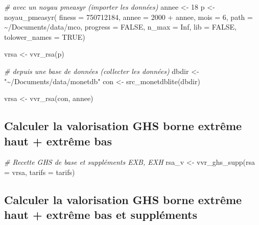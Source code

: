\documentclass[
]{book}
\newenvironment{Shaded}{\begin{snugshade}}{\end{snugshade}}
\newcommand{\AttributeTok}[1]{\textcolor[rgb]{0.77,0.63,0.00}{#1}}
\newcommand{\CommentTok}[1]{\textcolor[rgb]{0.56,0.35,0.01}{\textit{#1}}}
\newcommand{\ConstantTok}[1]{\textcolor[rgb]{0.00,0.00,0.00}{#1}}
\newcommand{\DecValTok}[1]{\textcolor[rgb]{0.00,0.00,0.81}{#1}}
\newcommand{\FunctionTok}[1]{\textcolor[rgb]{0.00,0.00,0.00}{#1}}
\newcommand{\NormalTok}[1]{#1}
\newcommand{\OtherTok}[1]{\textcolor[rgb]{0.56,0.35,0.01}{#1}}
\newcommand{\SpecialCharTok}[1]{\textcolor[rgb]{0.00,0.00,0.00}{#1}}
\newcommand{\StringTok}[1]{\textcolor[rgb]{0.31,0.60,0.02}{#1}}
\begin{document}
\begin{Shaded}
\begin{Highlighting}[]
\CommentTok{\# avec un noyau pmeasyr (importer les données)}
\NormalTok{annee }\OtherTok{\textless{}{-}} \DecValTok{18}
\NormalTok{p }\OtherTok{\textless{}{-}} \FunctionTok{noyau\_pmeasyr}\NormalTok{(}
  \AttributeTok{finess   =} \StringTok{\textquotesingle{}750712184\textquotesingle{}}\NormalTok{,}
  \AttributeTok{annee    =} \DecValTok{2000} \SpecialCharTok{+}\NormalTok{ annee,}
  \AttributeTok{mois     =} \DecValTok{6}\NormalTok{,}
  \AttributeTok{path     =} \StringTok{\textquotesingle{}\textasciitilde{}/Documents/data/mco\textquotesingle{}}\NormalTok{,}
  \AttributeTok{progress =} \ConstantTok{FALSE}\NormalTok{,}
  \AttributeTok{n\_max    =} \ConstantTok{Inf}\NormalTok{,}
  \AttributeTok{lib      =} \ConstantTok{FALSE}\NormalTok{,}
  \AttributeTok{tolower\_names =} \ConstantTok{TRUE}\NormalTok{)}

\NormalTok{vrsa }\OtherTok{\textless{}{-}} \FunctionTok{vvr\_rsa}\NormalTok{(p)}

\CommentTok{\# depuis une base de données (collecter les données)}
\NormalTok{dbdir }\OtherTok{\textless{}{-}} \StringTok{"\textasciitilde{}/Documents/data/monetdb"}
\NormalTok{con }\OtherTok{\textless{}{-}} \FunctionTok{src\_monetdblite}\NormalTok{(dbdir)}

\NormalTok{vrsa }\OtherTok{\textless{}{-}} \FunctionTok{vvr\_rsa}\NormalTok{(con, annee)}
\end{Highlighting}
\end{Shaded}

\hypertarget{calculer-la-valorisation-ghs-borne-extruxeame-haut-extruxeame-bas}{%
\subsection{Calculer la valorisation GHS borne extrême haut + extrême bas}\label{calculer-la-valorisation-ghs-borne-extruxeame-haut-extruxeame-bas}}

\begin{Shaded}
\begin{Highlighting}[]
\CommentTok{\# Recette GHS de base et suppléments EXB, EXH}
\NormalTok{rsa\_v }\OtherTok{\textless{}{-}} \FunctionTok{vvr\_ghs\_supp}\NormalTok{(}\AttributeTok{rsa =}\NormalTok{ vrsa, }\AttributeTok{tarifs =}\NormalTok{ tarifs)}
\end{Highlighting}
\end{Shaded}

\hypertarget{calculer-la-valorisation-ghs-borne-extruxeame-haut-extruxeame-bas-et-suppluxe9ments}{%
\subsection{Calculer la valorisation GHS borne extrême haut + extrême bas et suppléments}\label{calculer-la-valorisation-ghs-borne-extruxeame-haut-extruxeame-bas-et-suppluxe9ments}}
\end{document}
